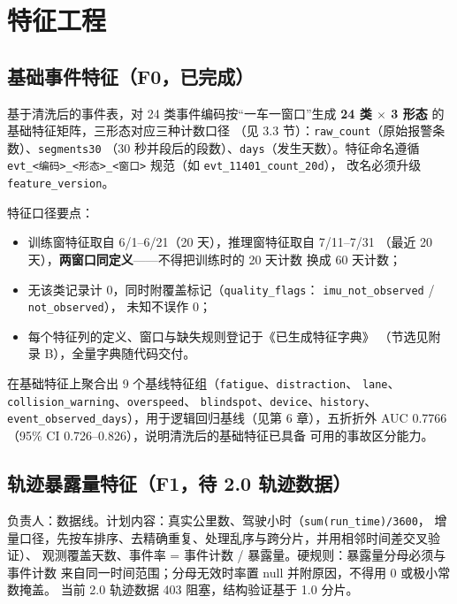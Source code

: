 \section{特征工程}

\subsection{基础事件特征（F0，已完成）}

基于清洗后的事件表，对 24 类事件编码按“一车一窗口”生成
\textbf{24 类 $\times$ 3 形态} 的基础特征矩阵，三形态对应三种计数口径
（见 3.3 节）：\texttt{raw\_count}（原始报警条数）、\texttt{segments30}
（30 秒并段后的段数）、\texttt{days}（发生天数）。特征命名遵循
\texttt{evt\_<编码>\_<形态>\_<窗口>} 规范（如 \texttt{evt\_11401\_count\_20d}），
改名必须升级 \texttt{feature\_version}。

特征口径要点：
\begin{itemize}
  \item 训练窗特征取自 6/1--6/21（20 天），推理窗特征取自 7/11--7/31
        （最近 20 天），\textbf{两窗口同定义}——不得把训练时的 20 天计数
        换成 60 天计数；
  \item 无该类记录计 0，同时附覆盖标记（\texttt{quality\_flags}：
        \texttt{imu\_not\_observed} / \texttt{not\_observed}），
        未知不误作 0；
  \item 每个特征列的定义、窗口与缺失规则登记于《已生成特征字典》
        （节选见附录 B），全量字典随代码交付。
\end{itemize}

在基础特征上聚合出 9 个基线特征组（\texttt{fatigue}、\texttt{distraction}、
\texttt{lane}、\texttt{collision\_warning}、\texttt{overspeed}、
\texttt{blindspot}、\texttt{device}、\texttt{history}、
\texttt{event\_observed\_days}），用于逻辑回归基线（见第 6 章），五折折外
AUC 0.7766（95\% CI 0.726--0.826），说明清洗后的基础特征已具备
可用的事故区分能力。

\subsection{轨迹暴露量特征（F1，待 2.0 轨迹数据）}

\begin{TODO}
负责人：数据线。计划内容：真实公里数、驾驶小时（\texttt{sum(run\_time)/3600}，
增量口径，先按车排序、去精确重复、处理乱序与跨分片，并用相邻时间差交叉验证）、
观测覆盖天数、事件率 = 事件计数 / 暴露量。硬规则：暴露量分母必须与事件计数
来自同一时间范围；分母无效时率置 null 并附原因，不得用 0 或极小常数掩盖。
当前 2.0 轨迹数据 403 阻塞，结构验证基于 1.0 分片。
\end{TODO}

